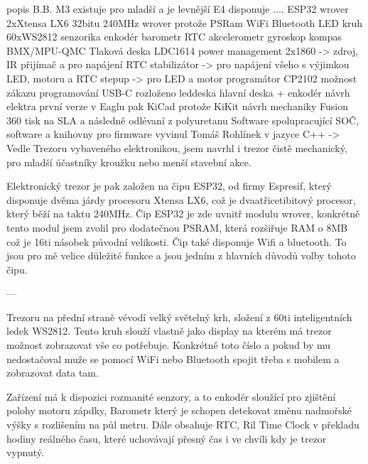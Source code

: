 popis B.B.
{
    M3
        existuje
        pro mladší a je levnější
    E4
        disponuje ....
            ESP32 wrover
                2xXtensa LX6
                    32bitu
                    240MHz
                wrover protože PSRam
                WiFi
                Bluetooth
            LED kruh
                60xWS2812
            senzorika
                enkodér  
                barometr
                RTC
                akcelerometr
                gyroskop
                kompas
                    BMX/MPU-QMC
                Tlaková deska
                    LDC1614                 %
            power management
                2x1860       -> zdroj, IR přijímač a pro napájení RTC
                stabilizátor -> pro napájení všeho s výjimkou LED, motoru a RTC
                stepup       -> pro LED a motor
            programátor
                CP2102 
                možnost zákazu programování
                USB-C
        rozloženo
            leddeska
            hlavní deska + enkodér
        návrh elektra
            první verze v Eaglu
            pak KiCad protože KiKit
        návrh mechaniky
            Fusion 360
            tisk na SLA a následně odlévaní z polyuretanu
        Software
            spolupracující SOČ, software a knihovny pro firmware vyvinul Tomáš Rohlínek 
                    v jazyce C++
}-> Vedle Trezoru vybaveného elektronikou, jsem navrhl i trezor čistě mechanický, 
    pro mladší účastníky kroužku nebo menší stavební akce.
    
    Elektronický trezor je pak založen na čipu ESP32, od firmy Espresif, který disponuje 
    dvěma járdy procesoru Xtensa LX6, 
    což je dvaatřicetibitový procesor, který běží na taktu 240MHz. 
    Čip ESP32 je zde uvnitř modulu wrover, konkrétně tento modul jsem zvolil pro dodatečnou 
    PSRAM, která rozšiřuje RAM o 8MB
    což je 16ti násobek původní velikosti.
    Čip také disponuje Wifi a bluetooth. To jsou pro mě velice důležité funkce a jsou 
    jedním z hlavních důvodů volby tohoto čipu.

    ---

    Trezoru na přední straně vévodí velký světelný krh, složení z 60ti inteligentních ledek 
    WS2812. Tento kruh slouží vlastně jako display na kterém má trezor možnost zobrazovat 
    vše co potřebuje. Konkrétně toto číslo  a pokud by mu nedostačoval muže se pomocí WiFi nebo Bluetooth spojit 
    třeba s mobilem a zobrazovat data tam. 

    Zařízení má k dispozici rozmanité senzory, a to
        enkodér sloužící pro zjištění polohy motoru zápdky,
        Barometr který je schopen detekovat změnu nadmořské výšky
        s rozlišením na půl metru. %
        Dále obsahuje RTC, Ril Time Clock v překladu hodiny reálného času, 
        které uchovávají přesný čas i ve chvíli kdy je trezor vypnutý.
        
